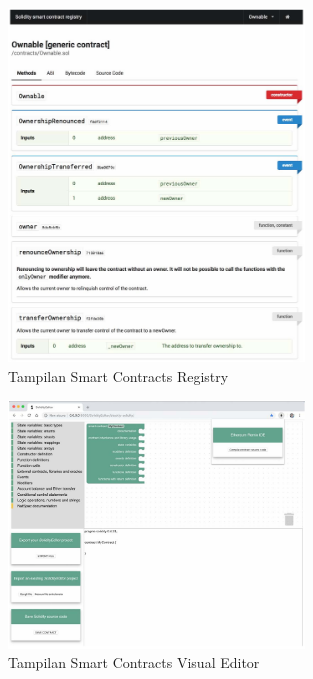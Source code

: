 \begin{figure}[ht]
	\centering
	\includegraphics[width=0.7\textwidth]{resources/chapter-2/sc-registry.png}
	\caption{Tampilan Smart Contracts Registry \parencite{guida2019supporting}}
	\label{image:sc-registry}
\end{figure}

\begin{figure}[ht]
	\centering
	\includegraphics[width=0.7\textwidth]{resources/chapter-2/sc-editor.png}
	\caption{Tampilan Smart Contracts Visual Editor \parencite{guida2019supporting}}
	\label{image:sc-editor}
\end{figure}

